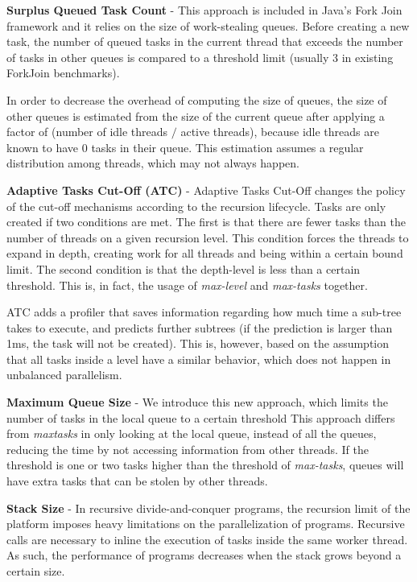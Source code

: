 \documentclass[smallextended]{svjour3}
\begin{document}
\textbf{Surplus Queued Task Count} - This approach is included in Java's Fork Join framework\cite{lea2000java} and it relies on the size of work-stealing queues. Before creating a new task, the number of queued tasks in the current thread that exceeds the number of tasks in other queues is compared to a threshold limit (usually 3 in existing ForkJoin benchmarks).

In order to decrease the overhead of computing the size of queues, the size of other queues is estimated from the size of the current queue after applying a factor of (number of idle threads $/$ active threads), because idle threads are known to have 0 tasks in their queue. This estimation assumes a regular distribution among threads, which may not always happen.

\textbf{Adaptive Tasks Cut-Off (ATC)} - Adaptive Tasks Cut-Off\cite{duran2008adaptive} changes the policy of the cut-off mechanisms according to the recursion lifecycle. Tasks are only created if two conditions are met. The first is that there are fewer tasks than the number of threads on a given recursion level. This condition forces the threads to expand in depth, creating work for all threads and being within a certain bound limit. The second condition is that the depth-level is less than a certain threshold. This is, in fact, the usage of \emph{max-level} and \emph{max-tasks} together.

ATC adds a profiler that saves information regarding how much time a sub-tree takes to execute, and predicts further subtrees (if the prediction is larger than 1ms, the task will not be created). This is, however, based on the assumption that all tasks inside a level have a similar behavior, which does not happen in unbalanced parallelism.

\textbf{Maximum Queue Size} - We introduce this new approach, which limits the number of tasks in the local queue to a certain threshold This approach differs from \emph{maxtasks} in only looking at the local queue, instead of all the queues, reducing the time by not accessing information from other threads. If the threshold is one or two tasks higher than the threshold of \emph{max-tasks}, queues will have extra tasks that can be stolen by other threads.

\textbf{Stack Size} - In recursive divide-and-conquer programs, the recursion limit of the platform imposes heavy limitations on the parallelization of programs. Recursive calls are necessary to inline the execution of tasks inside the same worker thread. As such, the performance of programs decreases when the stack grows beyond a certain size.
\end{document}
